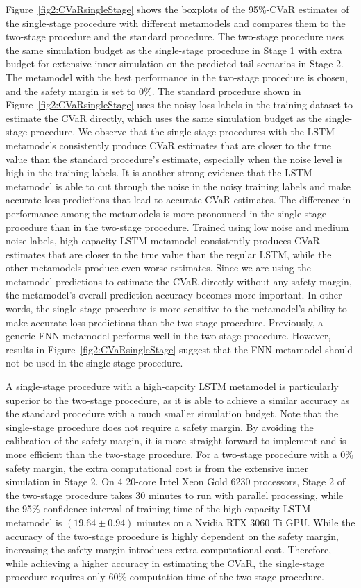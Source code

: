 Figure~\ref{fig2:CVaRsingleStage} shows the boxplots of the 95\%-CVaR estimates of the single-stage procedure with different metamodels and compares them to the two-stage procedure and the standard procedure.
The two-stage procedure uses the same simulation budget as the single-stage procedure in Stage 1 with extra budget for extensive inner simulation on the predicted tail scenarios in Stage 2.
The metamodel with the best performance in the two-stage procedure is chosen, and the safety margin is set to 0\%.
The standard procedure shown in Figure~\ref{fig2:CVaRsingleStage} uses the noisy loss labels in the training dataset to estimate the CVaR directly, which uses the same simulation budget as the single-stage procedure.
We observe that the single-stage procedures with the LSTM metamodels consistently produce CVaR estimates that are closer to the true value than the standard procedure's estimate, especially when the noise level is high in the training labels.
It is another strong evidence that the LSTM metamodel is able to cut through the noise in the noisy training labels and make accurate loss predictions that lead to accurate CVaR estimates.
The difference in performance among the metamodels is more pronounced in the single-stage procedure than in the two-stage procedure.
Trained using low noise and medium noise labels, high-capacity LSTM metamodel consistently produces CVaR estimates that are closer to the true value than the regular LSTM, while the other metamodels produce even worse estimates.
Since we are using the metamodel predictions to estimate the CVaR directly without any safety margin, the metamodel's overall prediction accuracy becomes more important.
In other words, the single-stage procedure is more sensitive to the metamodel's ability to make accurate loss predictions than the two-stage procedure.
Previously, a generic FNN metamodel performs well in the two-stage procedure. 
However, results in Figure~\ref{fig2:CVaRsingleStage} suggest that the FNN metamodel should not be used in the single-stage procedure.

A single-stage procedure with a high-capcity LSTM metamodel is particularly superior to the two-stage procedure, as it is able to achieve a similar accuracy as the standard procedure with a much smaller simulation budget.
Note that the single-stage procedure does not require a safety margin.
By avoiding the calibration of the safety margin, it is more straight-forward to implement and is more efficient than the two-stage procedure.
For a two-stage procedure with a 0\% safety margin, the extra computational cost is from the extensive inner simulation in Stage 2.
On 4 20-core Intel Xeon Gold 6230 processors, Stage 2 of the two-stage procedure takes 30 minutes to run with parallel processing, while the 95\% confidence interval of training time of the high-capacity LSTM metamodel is $(19.64 \pm 0.94)$ minutes on a Nvidia RTX 3060 Ti GPU.
While the accuracy of the two-stage procedure is highly dependent on the safety margin, increasing the safety margin introduces extra computational cost.
Therefore, while achieving a higher accuracy in estimating the CVaR, the single-stage procedure requires only $60\%$ computation time of the two-stage procedure.

